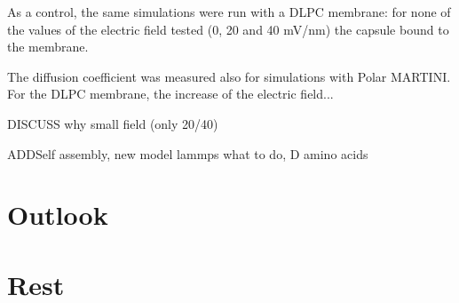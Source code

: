 As a control, the same simulations were run with a DLPC membrane: for none of the values of the electric field tested (0, 20 and 40 mV/nm) the capsule bound to the membrane.

The diffusion coefficient was measured also for simulations with Polar MARTINI. For the DLPC membrane, the increase of the electric field...



DISCUSS
why small field (only 20/40)


ADDSelf assembly, new model lammps what to do, D amino acids

\section{Outlook}


\section{Rest}
%
%
%
%

